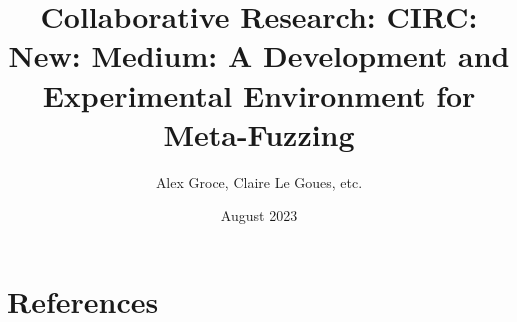 \documentclass[numbers]{proposalnsf}
\title{Collaborative Research: CIRC: New: Medium: A Development and 
Experimental Environment for Meta-Fuzzing}
\author{Alex Groce, Claire Le Goues, etc.}
\date{August 2023}
\newcommand{\cut}[1]{}
\begin{document}
\cut{
Cover Sheet
Project Summary
Table of Contents (automatically generated)
Project Description
References Cited
Biographical Sketch(es)
Budget and Budget Justification
Current and Pending Support
Facilities, Equipment and Other Resources
Data Management Plan
Postdoctoral Mentoring Plan (if applicable)
Collaborators & Other Affiliations Information
}


\newpage

\newpage
\tableofcontents
\newpage
{}
\setcounter{page}{1} 


%

\newpage
\section*{References}
\setcounter{page}{1}












\end{document}
